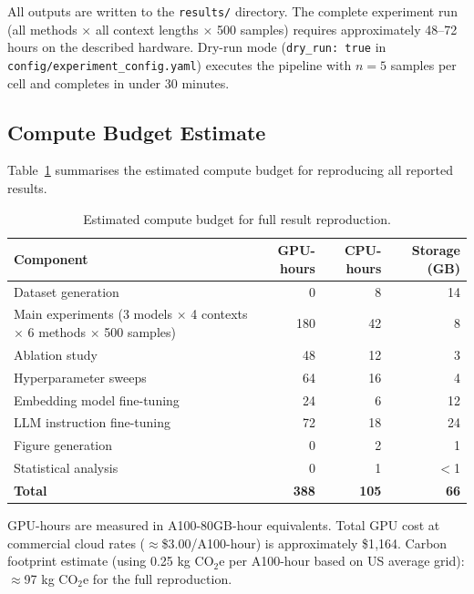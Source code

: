 All outputs are written to the \texttt{results/} directory.  The complete
experiment run (all methods $\times$ all context lengths $\times$ 500 samples)
requires approximately 48--72 hours on the described hardware.  Dry-run mode
(\texttt{dry\_run: true} in \texttt{config/experiment\_config.yaml}) executes
the pipeline with $n = 5$ samples per cell and completes in under 30 minutes.

\subsection{Compute Budget Estimate}

Table~\ref{tab:app_compute} summarises the estimated compute budget for
reproducing all reported results.

\begin{table}[h!]
\centering
\caption{Estimated compute budget for full result reproduction.}
\label{tab:app_compute}
\begin{tabular}{@{}lrrr@{}}
\toprule
\textbf{Component} & \textbf{GPU-hours} & \textbf{CPU-hours} & \textbf{Storage (GB)} \\
\midrule
Dataset generation          &   0 &   8 &  14 \\
Main experiments (3 models $\times$ 4 contexts $\times$ 6 methods $\times$ 500 samples)
                            & 180 &  42 &   8 \\
Ablation study              &  48 &  12 &   3 \\
Hyperparameter sweeps       &  64 &  16 &   4 \\
Embedding model fine-tuning &  24 &   6 &  12 \\
LLM instruction fine-tuning &  72 &  18 &  24 \\
Figure generation           &   0 &   2 &   1 \\
Statistical analysis        &   0 &   1 &  $<$1 \\
\midrule
\textbf{Total}              & \textbf{388} & \textbf{105} & \textbf{66} \\
\bottomrule
\end{tabular}
\end{table}

GPU-hours are measured in A100-80GB-hour equivalents.  Total GPU cost at
commercial cloud rates ($\approx$\$3.00/A100-hour) is approximately
\$1{,}164.  Carbon footprint estimate (using 0.25 kg CO$_2$e per A100-hour
based on US average grid): $\approx$97 kg CO$_2$e for the full reproduction.

